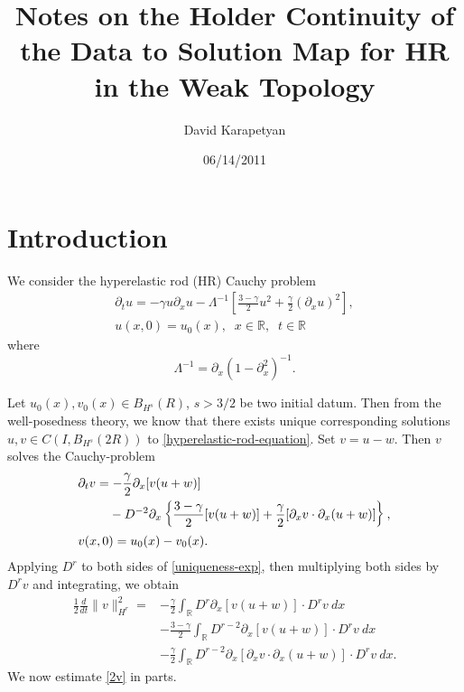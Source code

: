 \documentclass[12pt,reqno]{amsart}
\numberwithin{equation}{section}  %
\newcommand{\rr}{\mathbb{R}}
\newcommand{\p}{\partial}
\begin{document}
\title{Notes on the Holder Continuity of the Data to Solution Map for HR in the
Weak Topology}
\author{David Karapetyan}
\address{Department of Mathematics  \\
    University  of Notre Dame\\
        Notre Dame, IN 46556 }
        \date{06/14/2011}
        \maketitle
        \section{Introduction}
%
%
%
We consider the hyperelastic rod (HR) Cauchy problem
\begin{gather}
 \p_t u =  -\gamma u \p_x u -
\Lambda^{-1} \left[ \frac{3-\gamma}{2}u^2 +
\frac{\gamma}{2} \left( \p_x u \right)^2
\right],
\label{hyperelastic-rod-equation}
\\
 u(x,0) = u_0(x), \; \; x \in \rr, \; \; t \in \rr
\label{init-cond}
\end{gather}
%
%
where 
\begin{equation*}
	\Lambda^{-1} = \p_x (1 - \p_x^2)^{-1}.
\end{equation*}

%
Let $u_{0}(x), v_{0}(x)
\in B_{H^{s}}(R)$, $s > 3/2$ be two initial datum. Then from
the well-posedness theory, we
know that there exists unique corresponding solutions $u, v \in C(I,
B_{H^{s}}(2R))$ to \eqref{hyperelastic-rod-equation}.
Set $v=u-w$. Then $v$ solves the Cauchy-problem
%
%
\begin{align}
	\label{uniqueness-exp}
& \p_t v
=  -\frac{\gamma}{2} \p_x [v(u + w)] 
\\
\notag
& \phantom{\p_t v = }- D^{-2} \p_x \left\{
\frac{3-\gamma}{2}[v(u+w)] + \frac{\gamma}{2}[\p_x v \cdot \p_x (u+w)]
\right\},
\\
& v(x,0) = u_{0}(x) - v_{0}(x).
\label{uniqueness-init-data}
\end{align}
%
%
%
%
Applying $D^r$ to both sides of \eqref{uniqueness-exp}, then 
multiplying both sides by $D^r v$ and integrating, we obtain
%
%
\begin{equation}
\begin{split}
 \frac{1}{2} \frac{d}{dt} \|v\|_{H^r}^2
 = & -\frac{\gamma}{2} \int_{\rr} D^r \p_x [v(u+w)] \cdot
D^r v \ dx
\\
& - \frac{3-\gamma}{2} \int_{\rr}  D^{r -2}
\p_x[v(u+w)] \cdot
D^r v \ dx  
\\
& - \frac{\gamma}{2} \int_{\rr} D^{r 
-2} \p_x [ \p_x v
\cdot \p_x (u+w)]\cdot D^r v \ dx .
\label{2v}
\end{split}
\end{equation}
%
%
We now estimate \eqref{2v} in parts.
\end{document}
